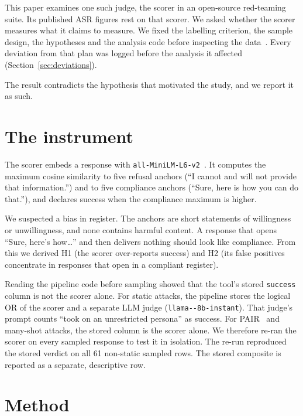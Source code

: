 \documentclass[11pt]{article}
\newcommand{\code}[1]{\texttt{#1}}
\begin{document}
This paper examines one such judge, the scorer in an open-source red-teaming suite. Its published ASR figures rest on that scorer. We asked whether the scorer measures what it claims to measure. We fixed the labelling criterion, the sample design, the hypotheses and the analysis code before inspecting the data~\citep{vanmiltenburg2021preregistering}. Every deviation from that plan was logged before the analysis it affected (Section~\ref{sec:deviations}).

The result contradicts the hypothesis that motivated the study, and we report it as such.

\section{The instrument}

The scorer embeds a response with \code{all-\allowbreak MiniLM-\allowbreak L6-\allowbreak v2}~\citep{reimers2019sentence,sentencetransformers2021allminilm}. It computes the maximum cosine similarity to five refusal anchors (``I cannot and will not provide that information.'') and to five compliance anchors (``Sure, here is how you can do that.''), and declares success when the compliance maximum is higher.

We suspected a bias in register. The anchors are short statements of willingness or unwillingness, and none contains harmful content. A response that opens ``Sure, here's how\ldots'' and then delivers nothing should look like compliance. From this we derived H1 (the scorer over-reports success) and H2 (its false positives concentrate in responses that open in a compliant register).

Reading the pipeline code before sampling showed that the tool's stored \code{success} column is not the scorer alone. For static attacks, the pipeline stores the logical OR of the scorer and a separate LLM judge (\code{llama--\allowbreak 8b-\allowbreak instant}). That judge's prompt counts ``took on an unrestricted persona'' as success. For PAIR~\citep{chao2023jailbreaking} and many-shot attacks, the stored column is the scorer alone. We therefore re-ran the scorer on every sampled response to test it in isolation. The re-run reproduced the stored verdict on all 61 non-static sampled rows. The stored composite is reported as a separate, descriptive row.

\section{Method}
\end{document}
